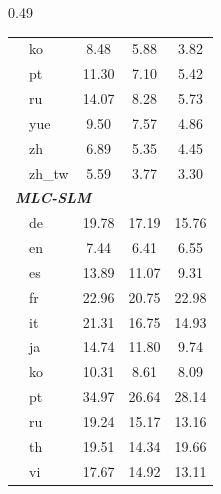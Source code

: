 \begin{table}[ht]
\begin{subtable}[t]{0.49\textwidth}
{\begin{tabular}{@{}clcc|c@{}}
&  ko     & 8.48  & 5.88  & 3.82  \\
&  pt     & 11.30 & 7.10  & 5.42  \\
&  ru     & 14.07 & 8.28  & 5.73  \\
&  yue    & 9.50  & 7.57  & 4.86  \\
&  zh     & 6.89  & 5.35  & 4.45  \\
&  zh\_tw & 5.59  & 3.77  & 3.30  \\
\midrule
\multicolumn{5}{l}{\textit{\textbf{MLC-SLM}}} \\
\midrule
&  de & 19.78 & 17.19 & 15.76 \\
&  en & 7.44  & 6.41  & 6.55  \\
&  es & 13.89 & 11.07 & 9.31  \\
&  fr & 22.96 & 20.75 & 22.98 \\
&  it & 21.31 & 16.75 & 14.93 \\
&  ja & 14.74 & 11.80 & 9.74  \\
&  ko & 10.31 & 8.61  & 8.09  \\
&  pt & 34.97 & 26.64 & 28.14 \\
&  ru & 19.24 & 15.17 & 13.16 \\
&  th & 19.51 & 14.34 & 19.66 \\
&  vi & 17.67 & 14.92 & 13.11 \\


\end{tabular}}
\end{subtable}
\end{table}
